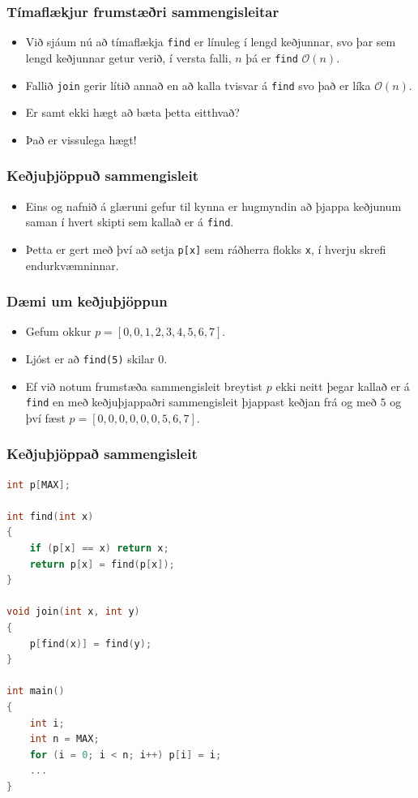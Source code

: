 \documentclass{beamer}
\begin{document}
\begin{frame}
\frametitle{Tímaflækjur frumstæðri sammengisleitar}
\begin{itemize}
	\item<1-> Við sjáum nú að tímaflækja \texttt{find} er línuleg í lengd keðjunnar, svo 
		þar sem lengd keðjunnar getur verið, í versta falli, $n$ þá er \texttt{find} $\mathcal{O}(n)$.
	\item<2-> Fallið \texttt{join} gerir lítið annað en að kalla tvisvar á \texttt{find} svo það er líka
		$\mathcal{O}(n)$.
	\item<3-> Er samt ekki hægt að bæta þetta eitthvað?
	\item<4-> Það er vissulega hægt!
\end{itemize}
\end{frame}

\begin{frame}
\frametitle{Keðjuþjöppuð sammengisleit}
\begin{itemize}
	\item<1-> Eins og nafnið á glæruni gefur til kynna er hugmyndin að þjappa keðjunum saman í hvert skipti sem kallað er á
		\texttt{find}.
	\item<2-> Þetta er gert með því að setja \texttt{p[x]} sem ráðherra flokks \texttt{x}, í hverju skrefi endurkvæmninnar.
\end{itemize}
\end{frame}

\begin{frame}
\frametitle{Dæmi um keðjuþjöppun}
\begin{itemize}
	\item<1-> Gefum okkur
		$p = [0, 0, 1, 2, 3, 4, 5, 6, 7]$.
	\item<2-> Ljóst er að \texttt{find(5)} skilar $0$.
	\item<3-> Ef við notum frumstæða sammengisleit breytist $p$ ekki neitt þegar kallað er á \texttt{find}
		en með keðjuþjappaðri sammengisleit þjappast keðjan frá og með $5$ og því fæst
		$p = [0, 0, 0, 0, 0, 0, 5, 6, 7]$.
\end{itemize}
\end{frame}

\begin{frame}[fragile]
	\frametitle{Keðjuþjöppað sammengisleit}
\tiny
\begin{lstlisting}[language=C++]
int p[MAX];

int find(int x)
{
	if (p[x] == x) return x;
	return p[x] = find(p[x]);
}

void join(int x, int y)
{
	p[find(x)] = find(y);
}

int main()
{
	int i;
	int n = MAX;
	for (i = 0; i < n; i++) p[i] = i;
	...
}
\end{lstlisting}
\end{frame}
\end{document}
